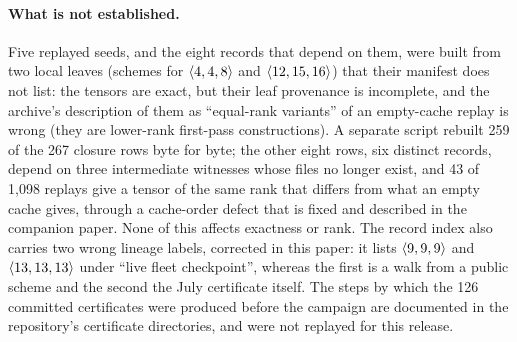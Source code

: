 \paragraph{What is not established.}
Five replayed seeds, and the eight records that depend on them, were built from two local leaves (schemes for $\langle 4,4,8\rangle$ and $\langle 12,15,16\rangle$) that their manifest does not list: the tensors are exact, but their leaf provenance is incomplete, and the archive's description of them as ``equal-rank variants'' of an empty-cache replay is wrong (they are lower-rank first-pass constructions).
A separate script rebuilt 259 of the 267 closure rows byte for byte; the other eight rows, six distinct records, depend on three intermediate witnesses whose files no longer exist, and 43 of 1{,}098 replays give a tensor of the same rank that differs from what an empty cache gives, through a cache-order defect that is fixed and described in the companion paper. None of this affects exactness or rank.
The record index also carries two wrong lineage labels, corrected in this paper: it lists $\langle 9,9,9\rangle$ and $\langle 13,13,13\rangle$ under ``live fleet checkpoint'', whereas the first is a walk from a public scheme and the second the July certificate itself.
The steps by which the 126 committed certificates were produced before the campaign are documented in the repository's certificate directories, and were not replayed for this release.
